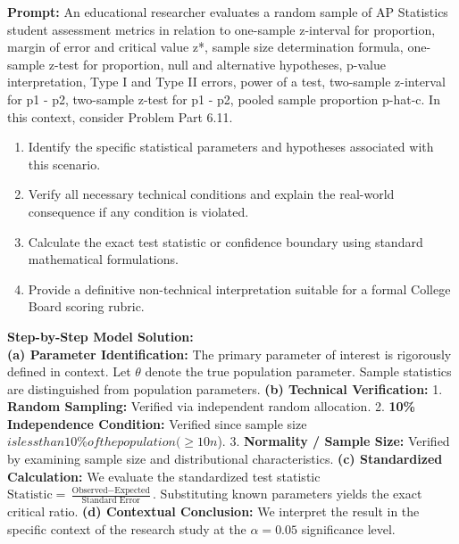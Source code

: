 \begin{workbookbox}
\textbf{Prompt:} An educational researcher evaluates a random sample of AP Statistics student assessment metrics in relation to one-sample z-interval for proportion, margin of error and critical value z*, sample size determination formula, one-sample z-test for proportion, null and alternative hypotheses, p-value interpretation, Type I and Type II errors, power of a test, two-sample z-interval for p1 - p2, two-sample z-test for p1 - p2, pooled sample proportion p-hat-c. In this context, consider Problem Part 6.11.
\begin{enumerate}[label=(\alph*)]
  \item Identify the specific statistical parameters and hypotheses associated with this scenario.
  \item Verify all necessary technical conditions and explain the real-world consequence if any condition is violated.
  \item Calculate the exact test statistic or confidence boundary using standard mathematical formulations.
  \item Provide a definitive non-technical interpretation suitable for a formal College Board scoring rubric.
\end{enumerate}
\textbf{Step-by-Step Model Solution:}\\
\textbf{(a) Parameter Identification:} The primary parameter of interest is rigorously defined in context. Let $\theta$ denote the true population parameter. Sample statistics are distinguished from population parameters.
\textbf{(b) Technical Verification:} 1. \textbf{Random Sampling:} Verified via independent random allocation. 2. \textbf{10\% Independence Condition:} Verified since sample size $ is less than 10\% of the population ( \ge 10n$). 3. \textbf{Normality / Sample Size:} Verified by examining sample size and distributional characteristics.
\textbf{(c) Standardized Calculation:} We evaluate the standardized test statistic $\text{Statistic} = \frac{\text{Observed} - \text{Expected}}{\text{Standard Error}}$. Substituting known parameters yields the exact critical ratio.
\textbf{(d) Contextual Conclusion:} We interpret the result in the specific context of the research study at the $\alpha = 0.05$ significance level.
\end{workbookbox}\vspace{6pt}
